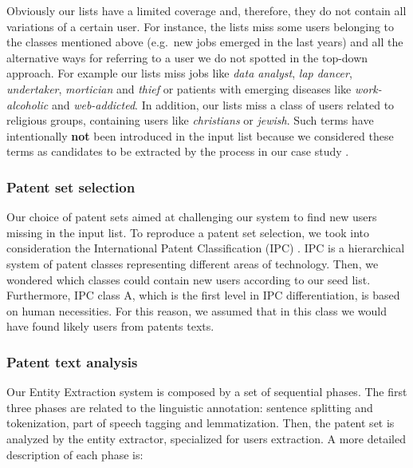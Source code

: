 \documentclass[]{book}
\begin{document}
Obviously our lists have a limited coverage and, therefore, they do not
contain all variations of a certain user. For instance, the lists miss
some users belonging to the classes mentioned above (e.g.~new jobs
emerged in the last years) and all the alternative ways for referring to
a user we do not spotted in the top-down approach. For example our lists
miss jobs like \emph{data analyst}, \emph{lap dancer},
\emph{undertaker}, \emph{mortician} and \emph{thief} or patients with
emerging diseases like \emph{work-alcoholic} and \emph{web-addicted}. In
addition, our lists miss a class of users related to religious groups,
containing users like \emph{christians} or \emph{jewish}. Such terms
have intentionally \textbf{not} been introduced in the input list
because we considered these terms as candidates to be extracted by the
process in our case study .

\subsubsection*{Patent set selection}\label{patent-set-selection}

Our choice of patent sets aimed at challenging our system to find new
users missing in the input list. To reproduce a patent set selection, we
took into consideration the International Patent Classification (IPC)
\citep{wipo1}. IPC is a hierarchical system of patent classes
representing different areas of technology. Then, we wondered which
classes could contain new users according to our seed list. Furthermore,
IPC class A, which is the first level in IPC differentiation, is based
on human necessities. For this reason, we assumed that in this class we
would have found likely users from patents texts.

\subsubsection*{Patent text analysis}\label{patent-text-analysis}

Our Entity Extraction system is composed by a set of sequential phases.
The first three phases are related to the linguistic annotation:
sentence splitting and tokenization, part of speech tagging and
lemmatization. Then, the patent set is analyzed by the entity extractor,
specialized for users extraction. A more detailed description of each
phase is:
\end{document}
